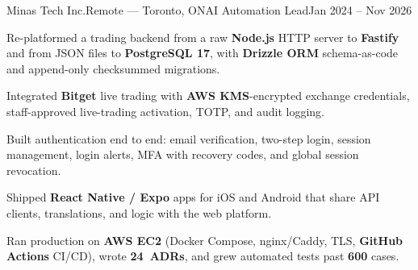 \begin{cvjob}{Minas Tech Inc.}{Remote --- Toronto, ON}{AI Automation Lead}{Jan 2024 -- Nov 2026}
  \item Re-platformed a trading backend from a raw \textbf{Node.js} HTTP server to \textbf{Fastify} and from JSON files to \textbf{PostgreSQL 17}, with \textbf{Drizzle ORM} schema-as-code and append-only checksummed migrations.
  \item Integrated \textbf{Bitget} live trading with \textbf{AWS KMS}-encrypted exchange credentials, staff-approved live-trading activation, TOTP, and audit logging.
  \item Built authentication end to end: email verification, two-step login, session management, login alerts, MFA with recovery codes, and global session revocation.
  \item Shipped \textbf{React Native / Expo} apps for iOS and Android that share API clients, translations, and logic with the web platform.
  \item Ran production on \textbf{AWS EC2} (Docker Compose, nginx/Caddy, TLS, \textbf{GitHub Actions} CI/CD), wrote \textbf{24~ADRs}, and grew automated tests past \textbf{600} cases.
\end{cvjob}
